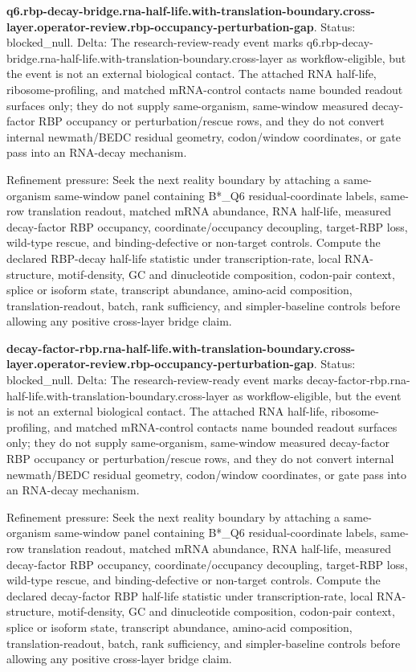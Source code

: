 \textbf{q6.rbp-decay-bridge.rna-half-life.with-translation-boundary.cross-layer.operator-review.rbp-occupancy-perturbation-gap}. Status: blocked\_null. Delta: The research-review-ready event marks q6.rbp-decay-bridge.rna-half-life.with-translation-boundary.cross-layer as workflow-eligible, but the event is not an external biological contact. The attached RNA half-life, ribosome-profiling, and matched mRNA-control contacts name bounded readout surfaces only; they do not supply same-organism, same-window measured decay-factor RBP occupancy or perturbation/rescue rows, and they do not convert internal newmath/BEDC residual geometry, codon/window coordinates, or gate pass into an RNA-decay mechanism.

Refinement pressure: Seek the next reality boundary by attaching a same-organism same-window panel containing B*\_Q6 residual-coordinate labels, same-row translation readout, matched mRNA abundance, RNA half-life, measured decay-factor RBP occupancy, coordinate/occupancy decoupling, target-RBP loss, wild-type rescue, and binding-defective or non-target controls. Compute the declared RBP-decay half-life statistic under transcription-rate, local RNA-structure, motif-density, GC and dinucleotide composition, codon-pair context, splice or isoform state, transcript abundance, amino-acid composition, translation-readout, batch, rank sufficiency, and simpler-baseline controls before allowing any positive cross-layer bridge claim.

\textbf{decay-factor-rbp.rna-half-life.with-translation-boundary.cross-layer.operator-review.rbp-occupancy-perturbation-gap}. Status: blocked\_null. Delta: The research-review-ready event marks decay-factor-rbp.rna-half-life.with-translation-boundary.cross-layer as workflow-eligible, but the event is not an external biological contact. The attached RNA half-life, ribosome-profiling, and matched mRNA-control contacts name bounded readout surfaces only; they do not supply same-organism, same-window measured decay-factor RBP occupancy or perturbation/rescue rows, and they do not convert internal newmath/BEDC residual geometry, codon/window coordinates, or gate pass into an RNA-decay mechanism.

Refinement pressure: Seek the next reality boundary by attaching a same-organism same-window panel containing B*\_Q6 residual-coordinate labels, same-row translation readout, matched mRNA abundance, RNA half-life, measured decay-factor RBP occupancy, coordinate/occupancy decoupling, target-RBP loss, wild-type rescue, and binding-defective or non-target controls. Compute the declared decay-factor RBP half-life statistic under transcription-rate, local RNA-structure, motif-density, GC and dinucleotide composition, codon-pair context, splice or isoform state, transcript abundance, amino-acid composition, translation-readout, batch, rank sufficiency, and simpler-baseline controls before allowing any positive cross-layer bridge claim.

